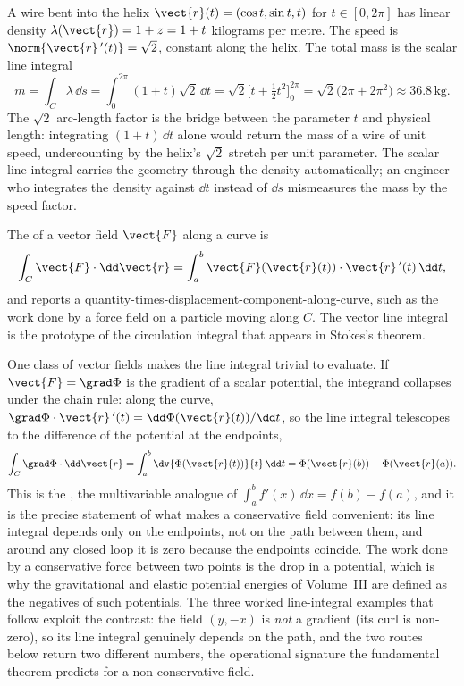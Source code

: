 \begin{example}
A wire bent into the helix $\vect{r}(t) = (\cos t, \sin t, t)$ for
$t \in [0, 2\pi]$ has linear density $\lambda(\vect{r}) = 1 + z =
1 + t$ kilograms per metre. The speed is $\norm{\vect{r}\,'(t)} =
\sqrt{2}$, constant along the helix. The total mass is the scalar
line integral
\[
m = \int_{C}\lambda\,\dd s = \int_{0}^{2\pi}(1 + t)\sqrt{2}\,\dd t =
\sqrt{2}\Big[t + \tfrac{1}{2}t^{2}\Big]_{0}^{2\pi} =
\sqrt{2}\big(2\pi + 2\pi^{2}\big) \approx 36.8\,\si{\kilogram}.
\]
The $\sqrt{2}$ arc-length factor is the bridge between the parameter
$t$ and physical length: integrating $(1 + t)\,\dd t$ alone would
return the mass of a wire of unit speed, undercounting by the helix's
$\sqrt{2}$ stretch per unit parameter. The scalar line integral
carries the geometry through the density automatically; an engineer
who integrates the density against $\dd t$ instead of $\dd s$
mismeasures the mass by the speed factor.
\end{example} The  of a vector field $\vect{F}$ along a curve is
\[
\int_{C} \vect{F} \cdot \dd\vect{r} = \int_{a}^{b} \vect{F}(\vect{r}(t))
\cdot \vect{r}\,'(t) \,\dd t,
\]
and reports a quantity-times-displacement-component-along-curve, such
as the work done by a force field on a particle moving along $C$.
The vector line integral is the prototype of the circulation
integral that appears in Stokes's theorem.

One class of vector fields makes the line integral trivial to
evaluate. If $\vect{F} = \grad\Phi$ is the gradient of a scalar
potential, the integrand collapses under the chain rule: along the
curve, $\grad\Phi\cdot\vect{r}\,'(t) = \dd\Phi(\vect{r}(t))/\dd t$, so
the line integral telescopes to the difference of the potential at the
endpoints,
\[
\int_{C}\grad\Phi\cdot\dd\vect{r} = \int_{a}^{b}\dv{\Phi(\vect{r}(t))}
{t}\,\dd t = \Phi(\vect{r}(b)) - \Phi(\vect{r}(a)).
\]
This is the , the
multivariable analogue of $\int_{a}^{b}f'(x)\,\dd x = f(b) - f(a)$, and
it is the precise statement of what makes a conservative field
convenient: its line integral depends only on the endpoints, not on
the path between them, and around any closed loop it is zero because the
endpoints coincide. The work done by a conservative force between two
points is the drop in a potential, which is why the gravitational and
elastic potential energies of Volume~III are defined as the negatives
of such potentials. The three worked line-integral examples that follow
exploit the contrast: the field $(y, -x)$ is \emph{not} a gradient (its
curl is non-zero), so its line integral genuinely depends on the path,
and the two routes below return two different numbers, the operational
signature the fundamental theorem predicts for a non-conservative
field.

